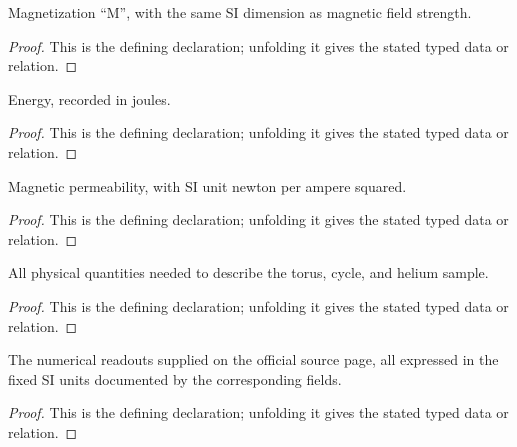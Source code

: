 \begin{definition}[Magnetization]
  \label{decl:physics:IPhO_2026_3_C_3:Magnetization}
  Magnetization “M”, with the same SI dimension as magnetic field strength.
\end{definition}
\begin{proof}
  This is the defining declaration; unfolding it gives the stated typed data or relation.
\end{proof}

\begin{definition}[Energy]
  \label{decl:physics:IPhO_2026_3_C_3:Energy}
  Energy, recorded in joules.
\end{definition}
\begin{proof}
  This is the defining declaration; unfolding it gives the stated typed data or relation.
\end{proof}

\begin{definition}[MagneticPermeability]
  \label{decl:physics:IPhO_2026_3_C_3:MagneticPermeability}
  Magnetic permeability, with SI unit newton per ampere squared.
\end{definition}
\begin{proof}
  This is the defining declaration; unfolding it gives the stated typed data or relation.
\end{proof}

\begin{definition}[Setup]
  \label{decl:physics:IPhO_2026_3_C_3:Setup}
  All physical quantities needed to describe the torus, cycle, and helium sample.
\end{definition}
\begin{proof}
  This is the defining declaration; unfolding it gives the stated typed data or relation.
\end{proof}

\begin{definition}[HasSuppliedData]
  \label{decl:physics:IPhO_2026_3_C_3:HasSuppliedData}
  The numerical readouts supplied on the official source page, all expressed in the fixed SI units documented by the corresponding fields.
\end{definition}
\begin{proof}
  This is the defining declaration; unfolding it gives the stated typed data or relation.
\end{proof}

